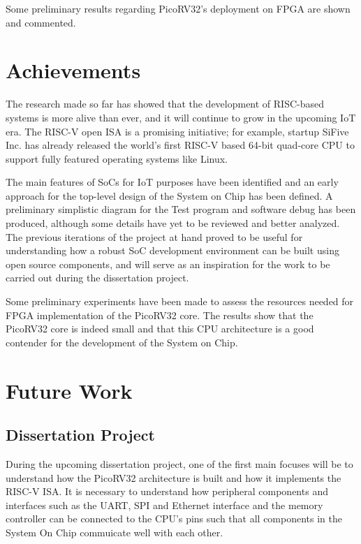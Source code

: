 Some preliminary results regarding PicoRV32's deployment on FPGA are shown and
commented.


\section{Achievements}
\label{section:achievements}

The research made so far has showed that the development of RISC-based systems
is more alive than ever, and it will continue to grow in the upcoming IoT
era. The RISC-V open ISA is a promising initiative; for example, startup SiFive
Inc. has already released the world’s first RISC-V based 64-bit quad-core CPU
to support fully featured operating systems like Linux.

The main features of SoCs for IoT purposes have been identified and an early
approach for the top-level design of the \socname System on Chip has been
defined. A preliminary simplistic diagram for the Test program and software
debug has been produced, although some details have yet to be reviewed and
better analyzed. The previous iterations of the project at hand proved to be
useful for understanding how a robust SoC development environment can be built
using open source components, and will serve as an inspiration for the work to
be carried out during the dissertation project.

Some preliminary experiments have been made to assess the resources needed for
FPGA implementation of the PicoRV32 core. The results show that the PicoRV32
core is indeed small and that this CPU architecture is a good contender for the
development of the \socname System on Chip.

\section{Future Work}
\label{section:future}

\subsection{Dissertation Project}

During the upcoming dissertation project, one of the first main focuses will be
to understand how the PicoRV32 architecture is built and how it implements the
RISC-V ISA. It is necessary to understand how peripheral components and
interfaces such as the UART, SPI and Ethernet interface and the memory
controller can be connected to the CPU's pins such that all components in the
\socname System On Chip commuicate well with each other.


